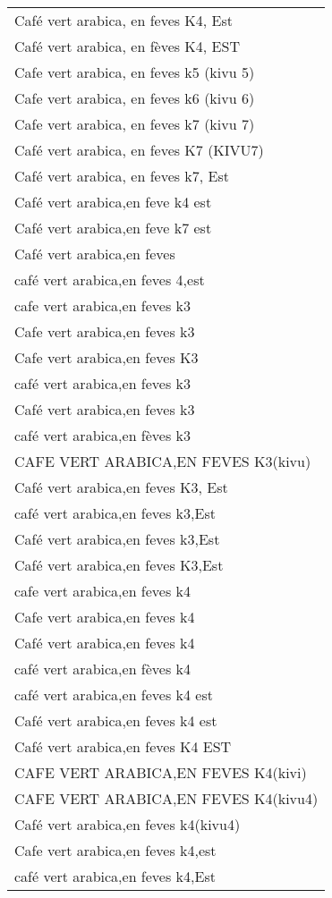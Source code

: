 \documentclass[
]{book}
\begin{document}
\begin{longtable}[t]{l}
Café vert arabica, en feves K4, Est\\
Café vert arabica, en fèves K4, EST\\
Cafe vert arabica, en feves k5 (kivu 5)\\
\addlinespace
Cafe vert arabica, en feves k6 (kivu 6)\\
Cafe vert arabica, en feves k7 (kivu 7)\\
Café vert arabica, en feves K7 (KIVU7)\\
Café vert arabica, en feves k7, Est\\
Café vert arabica,en feve k4 est\\
\addlinespace
Café vert arabica,en feve k7 est\\
Café vert arabica,en feves\\
café vert arabica,en feves 4,est\\
cafe vert arabica,en feves k3\\
Cafe vert arabica,en feves k3\\
\addlinespace
Cafe vert arabica,en feves K3\\
café vert arabica,en feves k3\\
Café vert arabica,en feves k3\\
café vert arabica,en fèves k3\\
CAFE VERT ARABICA,EN FEVES K3(kivu)\\
\addlinespace
Café vert arabica,en feves K3, Est\\
café vert arabica,en feves k3,Est\\
Café vert arabica,en feves k3,Est\\
Café vert arabica,en feves K3,Est\\
cafe vert arabica,en feves k4\\
\addlinespace
Cafe vert arabica,en feves k4\\
Café vert arabica,en feves k4\\
café vert arabica,en fèves k4\\
café vert arabica,en feves k4 est\\
Café vert arabica,en feves k4 est\\
\addlinespace
Café vert arabica,en feves K4 EST\\
CAFE VERT ARABICA,EN FEVES K4(kivi)\\
CAFE VERT ARABICA,EN FEVES K4(kivu4)\\
Café vert arabica,en feves k4(kivu4)\\
Cafe vert arabica,en feves k4,est\\
\addlinespace
café vert arabica,en feves k4,Est\\

\end{longtable}
\end{document}
